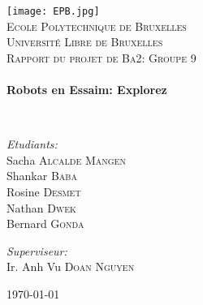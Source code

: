 \begin{titlepage}
\begin{center}

\texttt{[image: EPB.jpg]}~\\[1cm]

\textsc{\LARGE Ecole Polytechnique de Bruxelles\\Université Libre de Bruxelles}\\[1.5cm]

\textsc{\Large Rapport du projet de Ba2: Groupe 9}\\[0.5cm]

\HRule \\[0.4cm]
{ \huge \bfseries Robots en Essaim: Explorez\\[0.4cm] }

\HRule \\[1.5cm]

\begin{minipage}{0.49\textwidth}
\begin{flushleft} \large
\emph{Etudiants:}\\
Sacha \textsc{Alcalde Mangen}\\
Shankar \textsc{Baba}\\
Rosine \textsc{Desmet}\\
Nathan \textsc{Dwek}\\
Bernard \textsc{Gonda}\\
\end{flushleft}
\end{minipage}
\begin{minipage}{0.49\textwidth}
\begin{flushright} \large
\emph{Superviseur:} \\
Ir. Anh Vu \textsc{Doan Nguyen}
\end{flushright}
\end{minipage}

\vfill

{\large \today}

\end{center}
\end{titlepage}